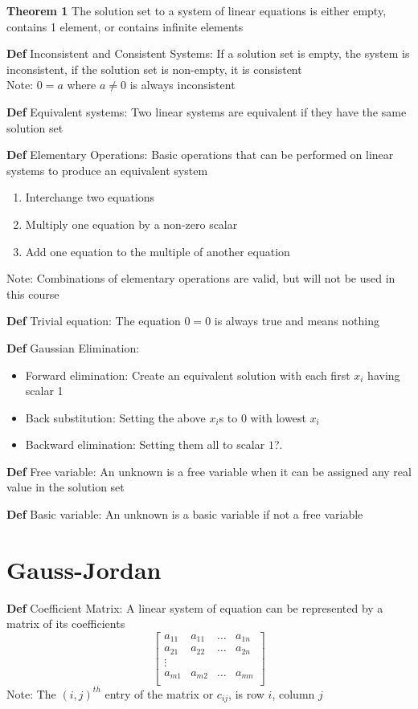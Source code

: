 \documentclass[11pt,notitlepage]{report}
\begin{document}
\textbf{Theorem 1} The solution set to a system of linear equations is either empty, contains 1 element, or contains infinite elements

\textbf{Def} Inconsistent and Consistent Systems: If a solution set is empty, the system is inconsistent, if the solution set is non-empty, it is consistent\\
\hspace*{5mm} Note: $0 = a$ where $a \ne 0$ is always inconsistent

\textbf{Def} Equivalent systems: Two linear systems are equivalent if they have the same solution set

\textbf{Def} Elementary Operations: Basic operations that can be performed on linear systems to produce an equivalent system
\begin{enumerate}[label=Type \Roman*:]
    \item Interchange two equations
    \item Multiply one equation by a non-zero scalar
    \item Add one equation to the multiple of another equation
\end{enumerate}
\hspace*{5mm} Note: Combinations of elementary operations are valid, but will not be used in this course

\textbf{Def} Trivial equation: The equation $0 = 0$ is always true and means nothing

\newpage
\textbf{Def} Gaussian Elimination: 
\begin{itemize}
    \item Forward elimination: Create an equivalent solution with each first $x_i$ having scalar 1
    \item Back substitution: Setting the above $x_i$s to 0 with lowest $x_i$
    \item Backward elimination: Setting them all to scalar $1$?.
\end{itemize}

\textbf{Def} Free variable: An unknown is a free variable when it can be assigned any real value in the solution set

\textbf{Def} Basic variable: An unknown is a basic variable if not a free variable

\section{Gauss-Jordan}

\textbf{Def} Coefficient Matrix: A linear system of equation can be represented by a matrix of its coefficients
$$\begin{bmatrix}
a_{11} & a_{11} & \dots & a_{1n}\\
a_{21} & a_{22} & \dots & a_{2n}\\
\vdots\\
a_{m1} & a_{m2} & \dots & a_{mn}\\
\end{bmatrix}$$
\hspace*{5mm} Note: The $(i, j)^{th}$ entry of the matrix or $c_{ij}$, is row $i$, column $j$
\end{document}
